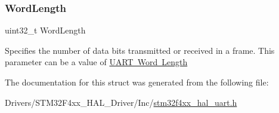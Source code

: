 \subsubsection{\texorpdfstring{Word\+Length}{WordLength}}
{\footnotesize\ttfamily uint32\+\_\+t Word\+Length}

Specifies the number of data bits transmitted or received in a frame. This parameter can be a value of \mbox{\hyperlink{group___u_a_r_t___word___length}{U\+A\+RT Word Length}} 

The documentation for this struct was generated from the following file\+:\begin{DoxyCompactItemize}
\item 
Drivers/\+S\+T\+M32\+F4xx\+\_\+\+H\+A\+L\+\_\+\+Driver/\+Inc/\mbox{\hyperlink{stm32f4xx__hal__uart_8h}{stm32f4xx\+\_\+hal\+\_\+uart.\+h}}\end{DoxyCompactItemize}
